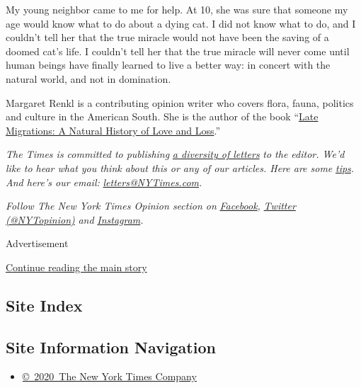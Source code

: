 My young neighbor came to me for help. At 10, she was sure that someone
my age would know what to do about a dying cat. I did not know what to
do, and I couldn't tell her that the true miracle would not have been
the saving of a doomed cat's life. I couldn't tell her that the true
miracle will never come until human beings have finally learned to live
a better way: in concert with the natural world, and not in domination.

Margaret Renkl is a contributing opinion writer who covers flora, fauna,
politics and culture in the American South. She is the author of the
book ``\href{https://milkweed.org/book/late-migrations}{Late Migrations:
A Natural History of Love and Loss}.''

\emph{The Times is committed to publishing}
\href{https://www.nytimes3xbfgragh.onion/2019/01/31/opinion/letters/letters-to-editor-new-york-times-women.html}{\emph{a
diversity of letters}} \emph{to the editor. We'd like to hear what you
think about this or any of our articles. Here are some}
\href{https://help.nytimes3xbfgragh.onion/hc/en-us/articles/115014925288-How-to-submit-a-letter-to-the-editor}{\emph{tips}}\emph{.
And here's our email:}
\href{mailto:letters@NYTimes.com}{\emph{letters@NYTimes.com}}\emph{.}

\emph{Follow The New York Times Opinion section on}
\href{https://www.facebookcorewwwi.onion/nytopinion}{\emph{Facebook}}\emph{,}
\href{http://twitter.com/NYTOpinion}{\emph{Twitter (@NYTopinion)}}
\emph{and}
\href{https://www.instagram.com/nytopinion/}{\emph{Instagram}}\emph{.}

Advertisement

\protect\hyperlink{after-bottom}{Continue reading the main story}

\hypertarget{site-index}{%
\subsection{Site Index}\label{site-index}}

\hypertarget{site-information-navigation}{%
\subsection{Site Information
Navigation}\label{site-information-navigation}}

\begin{itemize}
\tightlist
\item
  \href{https://help.nytimes3xbfgragh.onion/hc/en-us/articles/115014792127-Copyright-notice}{©~2020~The
  New York Times Company}
\end{itemize}


